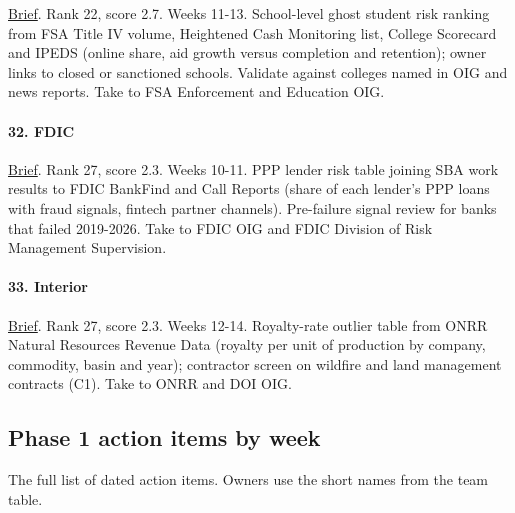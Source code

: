 \documentclass[letterpaper,11pt]{article}
\begin{document}
\href{agencies/ed.pdf}{Brief}. Rank 22, score 2.7. Weeks 11-13.
School-level ghost student risk ranking from FSA Title IV volume,
Heightened Cash Monitoring list, College Scorecard and IPEDS (online
share, aid growth versus completion and retention); owner links to
closed or sanctioned schools. Validate against colleges named in OIG and
news reports. Take to FSA Enforcement and Education OIG.

\hypertarget{fdic}{%
\paragraph{32. FDIC}\label{fdic}}

\href{agencies/fdic.pdf}{Brief}. Rank 27, score 2.3. Weeks 10-11. PPP
lender risk table joining SBA work results to FDIC BankFind and Call
Reports (share of each lender's PPP loans with fraud signals, fintech
partner channels). Pre-failure signal review for banks that failed
2019-2026. Take to FDIC OIG and FDIC Division of Risk Management
Supervision.

\hypertarget{interior}{%
\paragraph{33. Interior}\label{interior}}

\href{agencies/doi.pdf}{Brief}. Rank 27, score 2.3. Weeks 12-14.
Royalty-rate outlier table from ONRR Natural Resources Revenue Data
(royalty per unit of production by company, commodity, basin and year);
contractor screen on wildfire and land management contracts (C1). Take
to ONRR and DOI OIG.

\hypertarget{phase-1-action-items-by-week}{%
\subsection{Phase 1 action items by
week}\label{phase-1-action-items-by-week}}

The full list of dated action items. Owners use the short names from the
team table.
\end{document}
